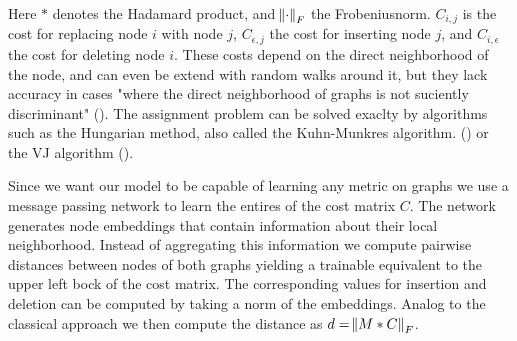 \vspace{.2cm}

Here $*$ denotes the Hadamard product, and  $\norm{\cdot}_F $ the Frobeniusnorm. $C_{i, j}$ is the cost for replacing node $i$ with node $j$, $C_{\epsilon, j}$ the cost for inserting node $j$, and $C_{i, \epsilon}$ the cost for deleting node $i$. These costs depend on the direct neighborhood of the node, and can even be extend with random walks around it, but they lack accuracy in cases "where the direct neighborhood of graphs is not suciently discriminant" (\citealp{hungarian2009}). The assignment problem can be solved exaclty by algorithms such as the Hungarian method, also called the Kuhn-Munkres algorithm. (\citealp{hungarian1955}) or the VJ algorithm (\citealp{vj1987}).

Since we want our model to be capable of learning any metric on graphs we use a message passing network to learn the entires of the cost matrix $C$. The network generates node embeddings that contain information about their local neighborhood. Instead of aggregating this information we compute pairwise distances between nodes of both graphs yielding a trainable equivalent to the upper left bock of the cost matrix. The corresponding values for insertion and deletion can be computed by taking a norm of the embeddings. Analog to the classical approach we then compute the distance as $ d = \norm{M * C}_F $.

